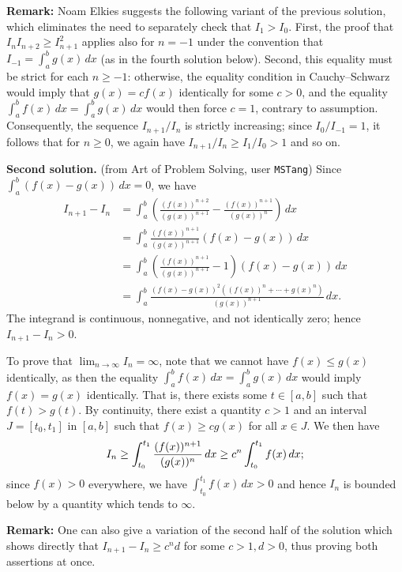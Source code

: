 \documentclass[amssymb,twocolumn,pra,10pt,aps]{revtex4-1}
\begin{document}
\begin{itemize}
\noindent
\textbf{Remark:}
Noam Elkies suggests the following variant of the previous solution,
which eliminates the need to separately check that $I_1 > I_0$.
First, the proof that $I_n I_{n+2} \geq I_{n+1}^2$ applies also for $n=-1$ under the convention that $I_{-1} = \int_a^b g(x)\,dx$ (as in the fourth solution below).
Second, this equality must be strict for each $n \geq -1$: 
otherwise, the equality condition in Cauchy--Schwarz would imply that 
$g(x) = c f(x)$ identically for some $c>0$, and the equality $\int_a^b f(x)\,dx = \int_a^b g(x)\,dx$ would then force $c=1$, contrary to assumption. Consequently, the sequence $I_{n+1}/I_n$ is strictly increasing; since
$I_0/I_{-1} = 1$, it follows that for $n \geq 0$, we again have $I_{n+1}/I_n \geq I_1/I_0 > 1$ and so on.

\textbf{Second solution.}
(from Art of Problem Solving, user \texttt{MSTang})
Since $\int_a^b (f(x) - g(x))\,dx = 0$,
we have
\begin{align*}
I_{n+1} - I_n &= \int_a^b \left( \frac{(f(x))^{n+2}}{(g(x))^{n+1}} - \frac{(f(x))^{n+1}}{(g(x))^{n}} \right)\,dx \\
&= \int_a^b \frac{(f(x))^{n+1}}{(g(x))^{n+1}} (f(x)-g(x))\,dx \\
&= \int_a^b \left(\frac{(f(x))^{n+1}}{(g(x))^{n+1}} - 1 \right) (f(x)-g(x))\,dx \\
&= \int_a^b \frac{(f(x)-g(x))^2 ((f(x))^n + \cdots + g(x)^n)}{(g(x))^{n+1}}\,dx.
\end{align*}
The integrand is continuous, nonnegative, and not identically zero; hence $I_{n+1} - I_n > 0$.

To prove that $\lim_{n \to \infty} I_n = \infty$, note that we cannot have $f(x) \leq g(x)$ identically, as then
the equality $\int_a^b f(x)\,dx = \int_a^b g(x)\,dx$ would imply $f(x) = g(x)$ identically. That is, there exists
some $t \in [a,b]$ such that $f(t) > g(t)$. By continuity, there exist a quantity $c > 1$
and an interval $J = [t_0, t_1]$ in $[a,b]$ such that $f(x) \geq c g(x)$ for all $x \in J$. We then have
\[
I_n \geq \int_{t_0}^{t_1} \frac{(f(x))^{n+1}}{(g(x))^n}\,dx \\
\geq c^n \int_{t_0}^{t_1} f(x)\,dx;
\]
since $f(x) > 0$ everywhere, we have $\int_{t_0}^{t_1} f(x)\,dx > 0$
and hence $I_n$ is bounded below by a quantity which tends to $\infty$.

\noindent
\textbf{Remark:}
One can also give a variation of the second half of the solution which shows directly that
$I_{n+1} - I_n \geq c^n d$ for some $c > 1, d>0$, thus proving both assertions at once.


\end{itemize}
\end{document}
